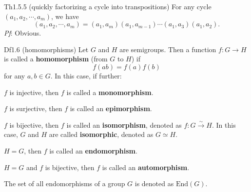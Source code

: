 \documentclass{article}
\begin{document}
\begin{Th}{Th1.5.5 (quickly factorizing a cycle into transpositions)}
    For any cycle $(a_1, a_2, \cdots, a_m)$, we have
    $$ (a_1, a_2, \cdots, a_m) = (a_1, a_m)(a_1, a_{m-1})\cdots(a_1, a_3)(a_1, a_2). $$
    \tcblower
    \textit{Pf}: Obvious.
\end{Th}

\begin{Df}{Df1.6 (homomorphisms)}
    Let $G$ and $H$ are semigroups. Then a function $f: G\to H$ is called a \textbf{homomorphism} (from $G$ to $H$) if 
    $$ f(ab) = f(a)f(b) $$
    for any $a, b\in G$. In this case, if further:
    \begin{compactenum}
        \item $f$ is injective, then $f$ is called a \textbf{monomorphism}.
        \item $f$ is surjective, then $f$ is called an \textbf{epimorphism}.
        \item $f$ is bijective, then $f$ is called an \textbf{isomorphism}, denoted as $f: G\overset{\sim}{\to} H$. In this case, $G$ and $H$ are called \textbf{isomorphic}, denoted as $G\simeq H$.
        \item $H = G$, then $f$ is called an \textbf{endomorphism}.
        \item $H = G$ and $f$ is bijective, then $f$ is called an \textbf{automorphism}.
    \end{compactenum}
    The set of all endomorphisms of a group $G$ is denoted as $\text{End}(G)$.
\end{Df}
\end{document}
